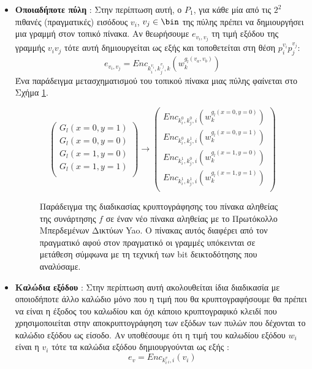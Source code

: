 \begin{itemize}
    \item \textbf{Οποιαδήποτε πύλη} : Στην περίπτωση αυτή, ο $P_1$, για κάθε μία από τις $2^2$ πιθανές (πραγματικές) εισόδους $v_i$, $v_j \in \bin$ της πύλης πρέπει να δημιουργήσει μια γραμμή στον τοπικό πίνακα. Αν θεωρήσουμε $e_{v_i, v_j}$ τη τιμή εξόδου της γραμμής $v_iv_j$ τότε αυτή δημιουργείται ως εξής και τοποθετείται στη θέση $p_i^{v_i}p_j^{v_j}$:
    \[
        e_{v_i, v_j} = Enc_{k_i^{v_i}, k_j^{v_j}, k}(w_k^{g_l(v_a, v_b)})
    \]
    Ένα παράδειγμα μετασχηματισμού του τοπικού πίνακα μιας πύλης φαίνεται στο Σχήμα \ref{fig:yaos-gc-local-truth-table}.
    \begin{figure}[h]
              \centering
              \[
                  \begin{pmatrix}
                      G_l(x=0, y=1)\\
                      G_l(x=0, y=0)\\
                      G_l(x=1, y=0)\\
                      G_l(x=1, y=1)\\
                  \end{pmatrix}
                  \rightarrow
                  \begin{pmatrix}
                      Enc_{k_i^{0}, k_j^{0}, i}(w_k^{g_l(x=0, y=0)})\\
                      Enc_{k_i^{0}, k_j^{1}, i}(w_k^{g_l(x=0, y=1)})\\
                      Enc_{k_i^{1}, k_j^{0}, i}(w_k^{g_l(x=1, y=0)})\\
                      Enc_{k_i^{1}, k_j^{1}, i}(w_k^{g_l(x=1, y=1)})\\
                  \end{pmatrix}
              \]
          \caption[Παράδειγμα της διαδικασίας κρυπτογράφησης του πίνακα αληθείας της συνάρτησης $f$ σε έναν νέο πίνακα αληθείας με το Πρωτόκολλο Μπερδεμένων Δικτύων Yao.]{Παράδειγμα της διαδικασίας κρυπτογράφησης του πίνακα αληθείας της συνάρτησης $f$ σε έναν νέο πίνακα αληθείας με το Πρωτόκολλο Μπερδεμένων Δικτύων Yao. Ο πίνακας αυτός διαφέρει από τον πραγματικό αφού στον πραγματικό οι γραμμές υπόκεινται σε μετάθεση σύμφωνα με τη τεχνική των bit δεικτοδότησης που αναλύσαμε.}
          \label{fig:yaos-gc-local-truth-table}
    \end{figure}
    \item \textbf{Καλώδια εξόδου} : Στην περίπτωση αυτή ακολουθείται ίδια διαδικασία με οποιοδήποτε άλλο καλώδιο μόνο που η τιμή που θα κρυπτογραφήσουμε θα πρέπει να είναι η έξοδος του καλωδίου και όχι κάποιο κρυπτογραφικό κλειδί που χρησιμοποιείται στην αποκρυπτογράφηση των εξόδων των πυλών που δέχονται το καλώδιο εξόδου ως είσοδο. Αν υποθέσουμε ότι η τιμή του καλωδίου εξόδου $w_i$ είναι η $v_i$ τότε τα καλώδια εξόδου δημιουργούνται ως εξής :
    \[
        e_v = Enc_{k_i^v_i, i}(v_i)
    \]
\end{itemize}

